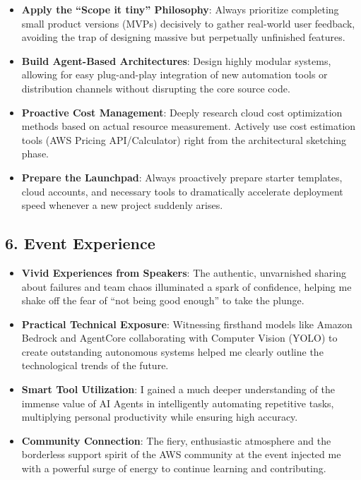 \begin{itemize}
\tightlist
\item
  \textbf{Apply the ``Scope it tiny'' Philosophy}: Always prioritize
  completing small product versions (MVPs) decisively to gather
  real-world user feedback, avoiding the trap of designing massive but
  perpetually unfinished features.
\item
  \textbf{Build Agent-Based Architectures}: Design highly modular
  systems, allowing for easy plug-and-play integration of new automation
  tools or distribution channels without disrupting the core source
  code.
\item
  \textbf{Proactive Cost Management}: Deeply research cloud cost
  optimization methods based on actual resource measurement. Actively
  use cost estimation tools (AWS Pricing API/Calculator) right from the
  architectural sketching phase.
\item
  \textbf{Prepare the Launchpad}: Always proactively prepare starter
  templates, cloud accounts, and necessary tools to dramatically
  accelerate deployment speed whenever a new project suddenly arises.
\end{itemize}

\hypertarget{event-experience}{%
\subsection{6. Event Experience}}

\begin{itemize}
\tightlist
\item
  \textbf{Vivid Experiences from Speakers}: The authentic, unvarnished
  sharing about failures and team chaos illuminated a spark of
  confidence, helping me shake off the fear of ``not being good enough''
  to take the plunge.
\item
  \textbf{Practical Technical Exposure}: Witnessing firsthand models
  like Amazon Bedrock and AgentCore collaborating with Computer Vision
  (YOLO) to create outstanding autonomous systems helped me clearly
  outline the technological trends of the future.
\item
  \textbf{Smart Tool Utilization}: I gained a much deeper understanding
  of the immense value of AI Agents in intelligently automating
  repetitive tasks, multiplying personal productivity while ensuring
  high accuracy.
\item
  \textbf{Community Connection}: The fiery, enthusiastic atmosphere and
  the borderless support spirit of the AWS community at the event
  injected me with a powerful surge of energy to continue learning and
  contributing.
\end{itemize}

